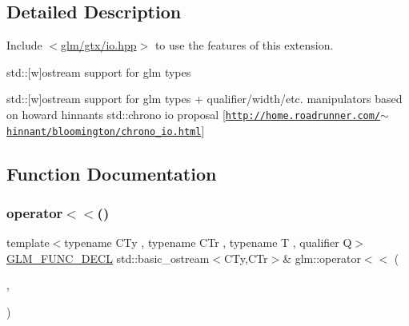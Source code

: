 \subsection{Detailed Description}
Include $<$\mbox{\hyperlink{io_8hpp}{glm/gtx/io.\+hpp}}$>$ to use the features of this extension.

std\+:\+:\mbox{[}w\mbox{]}ostream support for glm types

std\+:\+:\mbox{[}w\mbox{]}ostream support for glm types + qualifier/width/etc. manipulators based on howard hinnant\textquotesingle{}s std\+::chrono io proposal \mbox{[}\href{http://home.roadrunner.com/~hinnant/bloomington/chrono_io.html}{\tt http\+://home.\+roadrunner.\+com/$\sim$hinnant/bloomington/chrono\+\_\+io.\+html}\mbox{]} 

\subsection{Function Documentation}
\mbox{\label{group__gtx__io_ga0d49970be1b7cdc10a2b027cea97c7e3}} 
\subsubsection{\texorpdfstring{operator$<$$<$()}{operator<<()}\hspace{0.1cm}{\footnotesize\ttfamily [1/15]}}
{\footnotesize\ttfamily template$<$typename C\+Ty , typename C\+Tr , typename T , qualifier Q$>$ \\
\mbox{\hyperlink{setup_8hpp_ab2d052de21a70539923e9bcbf6e83a51}{G\+L\+M\+\_\+\+F\+U\+N\+C\+\_\+\+D\+E\+CL}} std\+::basic\+\_\+ostream$<$C\+Ty,C\+Tr$>$\& glm\+::operator$<$$<$ (\begin{DoxyParamCaption}\item[{std\+::basic\+\_\+ostream$<$ C\+Ty, C\+Tr $>$ \&}]{,  }\item[{\mbox{\hyperlink{structglm_1_1tquat}{tquat}}$<$ T, Q $>$ const \&}]{ }\end{DoxyParamCaption})}

\mbox{\label{group__gtx__io_ga7a029530f08d465cd95b60186c625aba}} 
